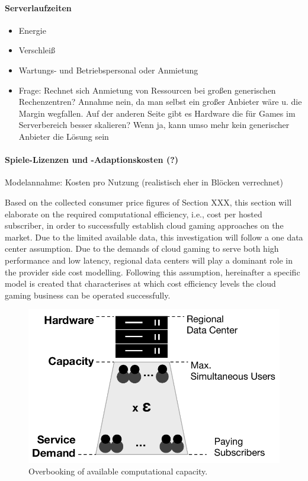 \paragraph{Serverlaufzeiten}

\begin{itemize}
	\item Energie
	\item Verschleiß
	\item Wartungs- und Betriebspersonal oder Anmietung
	\item Frage: Rechnet sich Anmietung von Ressourcen bei großen generischen Rechenzentren? Annahme nein, da man selbst ein großer Anbieter wäre u. die Margin wegfallen. Auf der anderen Seite gibt es Hardware die für Games im Serverbereich besser skalieren? Wenn ja, kann umso mehr kein generischer Anbieter die Lösung sein
\end{itemize}

\paragraph{Spiele-Lizenzen und -Adaptionskosten (?)}
Modelannahme: Kosten pro Nutzung (realistisch eher in Blöcken verrechnet)





Based on the collected consumer price figures of Section XXX, this section will elaborate on the required computational efficiency, i.e., cost per hosted subscriber, in order to successfully establish cloud gaming approaches on the market. Due to the limited available data, this investigation will follow a one data center assumption. Due to the demands of cloud gaming to serve both high performance and low latency, regional data centers will play a dominant role in the provider side cost modelling. Following this assumption, hereinafter a specific model is created that characterises at which cost efficiency levels the cloud gaming business can be operated successfully.

\begin{figure}[!t]
	\centering
	\includegraphics[width=0.65\columnwidth]{images/overbooking_datacenter.pdf}
	\caption{Overbooking of available computational capacity.}
\label{fig:overbooking_datacenter}
\end{figure}

